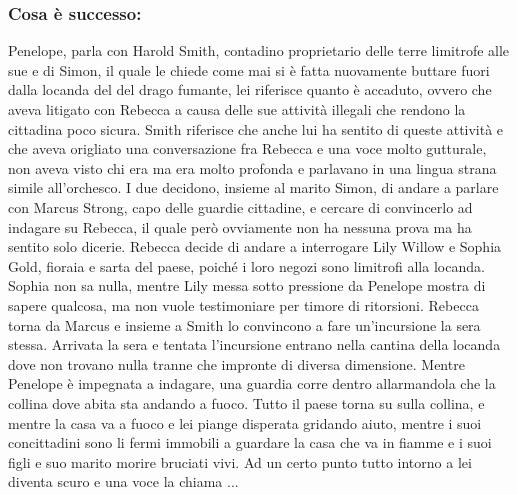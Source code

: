 \documentclass{article}
\begin{document}
              \subsubsection*{Cosa è successo: }
Penelope, parla con Harold Smith, contadino proprietario delle terre limitrofe alle sue e di Simon, il quale le chiede come mai si è fatta nuovamente buttare fuori dalla locanda del 
del drago fumante, lei riferisce quanto è accaduto, ovvero che aveva litigato con Rebecca a causa delle sue attività illegali che rendono la cittadina poco sicura. Smith riferisce che anche lui ha sentito di queste attività e che aveva origliato una conversazione
fra Rebecca e una voce molto gutturale, non aveva visto chi era ma era molto profonda e parlavano in una lingua strana simile all'orchesco. I due decidono, insieme al marito Simon, di andare a parlare con 
Marcus Strong, capo delle guardie cittadine, e cercare di convincerlo ad indagare su Rebecca, il quale però ovviamente non ha nessuna prova ma ha sentito solo dicerie. Rebecca decide di andare a interrogare 
Lily Willow e Sophia Gold, fioraia e sarta del paese, poiché i loro negozi sono limitrofi alla locanda. Sophia non sa nulla, mentre Lily messa sotto pressione da Penelope mostra di sapere qualcosa, ma non vuole testimoniare per timore di ritorsioni.
Rebecca torna da Marcus e insieme a Smith lo convincono a fare un'incursione la sera stessa. Arrivata la sera e tentata l'incursione entrano nella cantina della locanda dove non trovano nulla tranne che impronte di diversa dimensione. Mentre Penelope è impegnata a indagare, una guardia corre dentro allarmandola che la collina 
dove abita sta andando a fuoco. Tutto il paese torna su sulla collina, e mentre la casa va a fuoco e lei piange disperata gridando aiuto, mentre i suoi concittadini sono 
li fermi immobili a guardare la casa che va in fiamme e i suoi figli e suo marito morire bruciati vivi. Ad un certo punto tutto intorno a lei diventa scuro e una voce la chiama ... 
\end{document}
